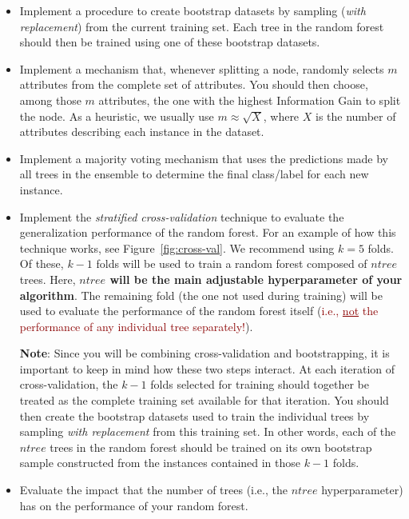 \documentclass{article}
\begin{document}
\begin{itemize}
\begin{mybox}[boxblue]
When determining the best numerical threshold to use when splitting numerical nodes, you may \textit{\textbf{(i)}} use the average value of that attribute across the instances in the partition associated with the current node; or \textit{\textbf{(ii)}} use the more sophisticated (and ``powerful'') technique discussed in Lecture 04 (for students in the remote section) and Lecture 05 (for students in the in-person section). 
\end{mybox}
%
\item Implement a procedure to create bootstrap datasets by sampling (\textit{with replacement}) from the current training set. Each tree in the random forest should then be trained using one of these bootstrap datasets.
\item Implement a mechanism that, whenever splitting a node, randomly selects $m$ attributes from the complete set of attributes. You should then choose, among those $m$ attributes, the one with the highest Information Gain to split the node. As a heuristic, we usually use $m \approx \sqrt{X}$, where $X$ is the number of attributes describing each instance in the dataset.
\item Implement a majority voting mechanism that uses the predictions made by all trees in the ensemble to determine the final class/label for each new instance.
\item Implement the \textit{stratified cross-validation} technique to evaluate the generalization performance of the random forest. For an example of how this technique works, see Figure~\ref{fig:cross-val}. We recommend using $k=5$ folds. Of these, $k-1$ folds will be used to train a random forest composed of $ntree$ trees. Here, \textbf{$ntree$ will be the main adjustable hyperparameter of your algorithm}. The remaining fold (the one not used during training) will be used to evaluate the performance of the random forest itself (\textcolor{darkred}{i.e., \underline{not} the performance of any individual tree separately!}). 
\begin{mybox}[boxgreen] 
\textbf{Note}:
Since you will be combining cross-validation and bootstrapping, it is important to keep in mind how these two steps interact. At each iteration of cross-validation, the $k-1$ folds selected for training should together be treated as the complete training set available for that iteration. You should then create the bootstrap datasets used to train the individual trees by sampling \textit{with replacement} from this training set. In other words, each of the $ntree$ trees in the random forest should be trained on its own bootstrap sample constructed from the instances contained in those $k-1$ folds.
\end{mybox}
%
\item Evaluate the impact that the number of trees (i.e., the $ntree$ hyperparameter) has on the performance of your random forest.
%
\end{itemize}
\end{document}
